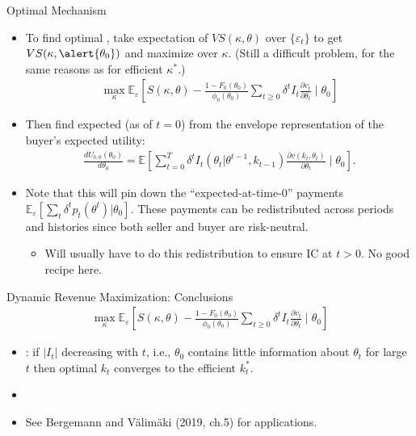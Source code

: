 \documentclass[english,10pt
,aspectratio=169
]{beamer}
\begin{document}
\begin{frame}{Optimal Mechanism}
\begin{itemize}
	\item To find optimal , take expectation of $VS(\kappa,\theta)$ over $\{\varepsilon_t\}$ to get $VS(\kappa,\alert{\theta_0})$ and maximize over $\kappa$.
	(Still a difficult problem, for the same reasons as for efficient $\kappa^*$.)
	\vspace{-0.5em}\begin{align*}
		\max_\kappa \mathbb{E}_\varepsilon \left[ S(\kappa,\theta) - \frac{1-F_0(\theta_0)}{\phi_0(\theta_0)} \sum_{t\geq 0} \delta^t I_t \frac{\partial v_t}{\partial \theta_t} \mid \theta_0 \right]
	\end{align*}\vspace{-1em}

	\item Then find expected (as of $t=0$)  from the envelope representation of the buyer's expected utility:
	\vspace{-0.5em}\begin{align*}
		\frac{d U_{b,0} (\theta_0)}{d \theta_0} = \mathbb{E} \left[ \sum_{t=0}^{T} \delta^t I_t(\theta_t | \theta^{t-1}, k_{t-1})\frac{\partial v(k_t,\theta_t)}{\partial \theta_t} \mid \theta_0 \right].
	\end{align*}\vspace{-1em}

	\item Note that this will pin down the ``expected-at-time-0'' payments $\mathbb{E}_\varepsilon [\sum_t \delta^t p_t(\theta^t)|\theta_0]$. These payments can be redistributed across periods and histories since both seller and buyer are risk-neutral.
	\begin{itemize}
		\item Will usually have to do this redistribution to ensure IC at $t > 0$. No good recipe here.
	\end{itemize}
\end{itemize}
\end{frame}



\begin{frame}{Dynamic Revenue Maximization: Conclusions}
\begin{align*}
	\max_\kappa \mathbb{E}_\varepsilon \left[ S(\kappa,\theta) - \frac{1-F_0(\theta_0)}{\phi_0(\theta_0)} \sum_{t\geq 0} \delta^t I_t \frac{\partial v_t}{\partial \theta_t} \mid \theta_0 \right]
\end{align*}
\begin{itemize}
	\item {}: if $|I_t|$ decreasing with $t$, i.e., $\theta_0$ contains little information about $\theta_t$ for large $t$ then optimal $k_t$ converges to the efficient $k^*_t$.
	\item {}
	\item See Bergemann and Välimäki (2019, ch.5) for applications.
\end{itemize}
\end{frame}
\end{document}

